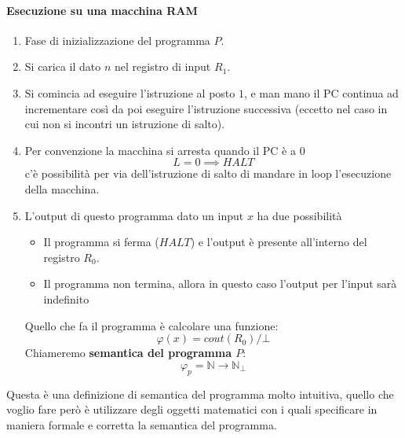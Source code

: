\documentclass{article}
\begin{document}
\paragraph{Esecuzione su una macchina RAM}
\begin{enumerate}
    \item Fase di inizializzazione del programma $P$.
    \item Si carica il dato $n$ nel registro di input $R_1$.
    \item Si comincia ad eseguire l'istruzione al posto $1$, e man mano
          il PC continua ad incrementare così da poi eseguire l'istruzione successiva
          (eccetto nel caso in cui non si incontri un istruzione di salto).
    \item Per convenzione la macchina si arresta quando il PC è a $0$
          $$L=0\implies HALT$$
          c'è possibilità per via dell'istruzione di salto di mandare in loop
          l'esecuzione della macchina.
    \item L'output di questo programma dato un input $x$ ha due possibilità
          \begin{itemize}
              \item Il programma si ferma ($HALT$) e l'output è presente all'interno del registro $R_0$.
              \item Il programma non termina, allora in questo caso l'output
                    per l'input sarà indefinito
          \end{itemize}
          Quello che fa il programma è calcolare una funzione:
          $$\varphi(x)=cout(R_0)/\bot$$
          Chiameremo \textbf{semantica del programma $P$}:
          $$\varphi_p = \mathbb{N}\rightarrow\mathbb{N}_\bot$$
\end{enumerate}
Questa è una definizione di semantica del programma molto intuitiva, quello che voglio
fare però è utilizzare degli oggetti matematici con i quali specificare
in maniera formale e corretta la semantica del programma.
\end{document}
